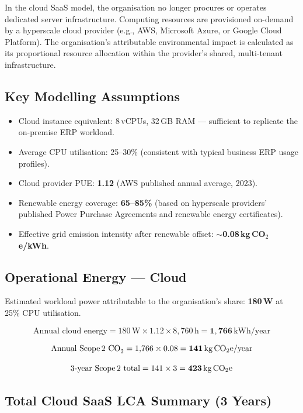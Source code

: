 In the cloud SaaS model, the organisation no longer procures or operates
dedicated server infrastructure. Computing resources are provisioned
on-demand by a hyperscale cloud provider (e.g., AWS, Microsoft Azure, or
Google Cloud Platform). The organisation's attributable environmental
impact is calculated as its proportional resource allocation within the
provider's shared, multi-tenant infrastructure.

\subsection{Key Modelling Assumptions}

\begin{itemize}[label=\textcolor{lightgreen}{--}]
  \item Cloud instance equivalent: 8\,vCPUs, 32\,GB RAM --- sufficient to
    replicate the on-premise ERP workload.
  \item Average CPU utilisation: 25--30\% (consistent with typical
    business ERP usage profiles).
  \item Cloud provider PUE: \textbf{1.12} (AWS published annual average,
    2023).
  \item Renewable energy coverage: \textbf{65--85\%} (based on hyperscale
    providers' published Power Purchase Agreements and renewable energy
    certificates).
  \item Effective grid emission intensity after renewable offset:
    $\sim$\textbf{0.08\,kg\,CO$_2$e/kWh}.
\end{itemize}

\subsection{Operational Energy --- Cloud}

Estimated workload power attributable to the organisation's share:
\textbf{180\,W} at 25\% CPU utilisation.

\[
\text{Annual cloud energy}
  = 180\,\mathrm{W} \times 1.12 \times 8{,}760\,\mathrm{h}
  = \mathbf{1{,}766\,\mathrm{kWh/year}}
\]

\[
\text{Annual Scope\,2 CO}_{2}
  = 1{,}766 \times 0.08
  = \mathbf{141\,\mathrm{kg\,CO_2e/year}}
\]

\[
\text{3-year Scope\,2 total}
  = 141 \times 3
  = \mathbf{423\,\mathrm{kg\,CO_2e}}
\]

\subsection{Total Cloud SaaS LCA Summary (3 Years)}

